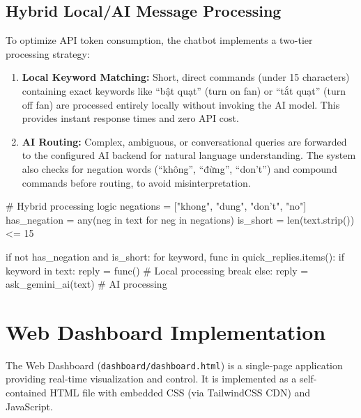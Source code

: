 \documentclass[12pt,a4paper]{report}
\begin{document}
\subsection{Hybrid Local/AI Message Processing}
To optimize API token consumption, the chatbot implements a two-tier processing strategy:

\begin{enumerate}
    \item \textbf{Local Keyword Matching:} Short, direct commands (under 15 characters) containing exact keywords like \foreignlanguage{vietnamese}{``bật quạt''} (turn on fan) or \foreignlanguage{vietnamese}{``tắt quạt''} (turn off fan) are processed entirely locally without invoking the AI model. This provides instant response times and zero API cost.
    
    \item \textbf{AI Routing:} Complex, ambiguous, or conversational queries are forwarded to the configured AI backend for natural language understanding. The system also checks for negation words (\foreignlanguage{vietnamese}{``không''}, \foreignlanguage{vietnamese}{``đừng''}, ``don't'') and compound commands before routing, to avoid misinterpretation.
\end{enumerate}

\begin{codebox}[Python]
# Hybrid processing logic
negations = ["khong", "dung", "don't", "no"]
has_negation = any(neg in text for neg in negations)
is_short = len(text.strip()) <= 15

if not has_negation and is_short:
    for keyword, func in quick_replies.items():
        if keyword in text:
            reply = func()  # Local processing
            break
else:
    reply = ask_gemini_ai(text)  # AI processing
\end{codebox}

\section{Web Dashboard Implementation}
The Web Dashboard (\texttt{dashboard/dashboard.html}) is a single-page application providing real-time visualization and control. It is implemented as a self-contained HTML file with embedded CSS (via TailwindCSS CDN) and JavaScript.
\end{document}
